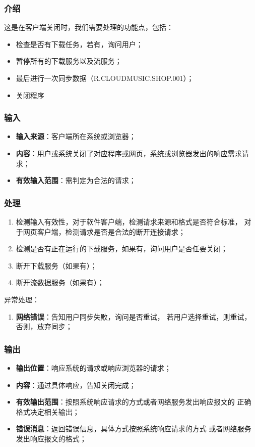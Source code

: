 \subsubsection{介绍}
	这是在客户端关闭时，我们需要处理的功能点，包括：
	\begin{itemize}
		\item 检查是否有下载任务，若有，询问用户；
		\item 暂停所有的下载服务以及流服务；
		\item 最后进行一次同步数据（R.CLOUDMUSIC.SHOP.001）；
		\item 关闭程序
	\end{itemize}
\subsubsection{输入}
	\begin{itemize}
		\item \textbf{输入来源}：客户端所在系统或浏览器；
		\item \textbf{内容}：用户或系统关闭了对应程序或网页，系统或浏览器发出的响应需求请求；
		\item \textbf{有效输入范围}：需判定为合法的请求；
	\end{itemize}
\subsubsection{处理}
	\begin{enumerate}
		\item 检测输入有效性，对于软件客户端，检测请求来源和格式是否符合标准，
			对于网页客户端，检测请求是否是合法的断开连接请求；
		\item 检测是否有正在运行的下载服务，如果有，询问用户是否任要关闭；
		\item 断开下载服务（如果有）；
		\item 断开流数据服务（如果有）；
	\end{enumerate}
	\noindent 异常处理：
	\begin{enumerate}
		\item \textbf{网络错误}：告知用户同步失败，询问是否重试，
			若用户选择重试，则重试，否则，放弃同步；
	\end{enumerate}
\subsubsection{输出}
\begin{itemize}
	\item \textbf{输出位置}：响应系统的请求或响应浏览器的请求；
	\item \textbf{内容}：通过具体响应，告知关闭完成；
	\item \textbf{有效输出范围}：按照系统响应请求的方式或者网络服务发出响应报文的
		正确格式决定相关输出；
	\item \textbf{错误消息}：返回错误信息，具体方式按照系统响应请求的方式
		或者网络服务发出响应报文的格式；
\end{itemize}

